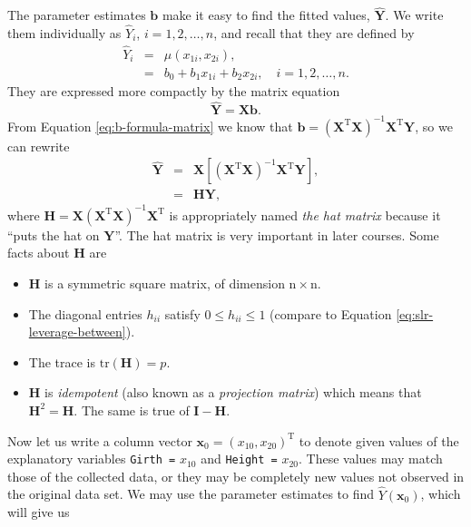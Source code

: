 \documentclass[captions=tableheading]{scrbook}
\begin{document}
The parameter estimates \(\mathbf{b}\) make it easy to find the fitted values, \(\hat{\mathbf{Y}}\). We write them individually as \(\hat{Y}_{i}\), \(i=1,2,\ldots,n\), and recall that they are defined by
\begin{eqnarray}
\hat{Y}_{i} & = & \hat{\mu}(x_{1i},x_{2i}),\\
 & = & b_{0}+b_{1}x_{1i}+b_{2}x_{2i},\quad i=1,2,\ldots,n.
\end{eqnarray}
They are expressed more compactly by the matrix equation
\begin{equation}
\hat{\mathbf{Y}}=\mathbf{X}\mathbf{b}.
\end{equation}
From Equation \ref{eq:b-formula-matrix} we know that \(\mathbf{b}=\left(\mathbf{X}^{\mathrm{T}}\mathbf{X}\right)^{-1}\mathbf{X}^{\mathrm{T}}\mathbf{Y}\), so we can rewrite
\begin{eqnarray}
\hat{\mathbf{Y}} & = & \mathbf{X}\left[\left(\mathbf{X}^{\mathrm{T}}\mathbf{X}\right)^{-1}\mathbf{X}^{\mathrm{T}}\mathbf{Y}\right],\\
 & = & \mathbf{H}\mathbf{Y},
\end{eqnarray}
where \(\mathbf{H}=\mathbf{X}\left(\mathbf{X}^{\mathrm{T}}\mathbf{X}\right)^{-1}\mathbf{X}^{\mathrm{T}}\) is appropriately named \emph{the hat matrix} because it ``puts the hat on \(\mathbf{Y}\)''. The hat matrix is very important in later courses. Some facts about \(\mathbf{H}\) are
\begin{itemize}
\item \(\mathbf{H}\) is a symmetric square matrix, of dimension \(\mathrm{n}\times\mathrm{n}\).
\item The diagonal entries \(h_{ii}\) satisfy \(0\leq h_{ii}\leq1\) (compare to Equation \ref{eq:slr-leverage-between}).
\item The trace is \(\mathrm{tr}(\mathbf{H})=p\).
\item \(\mathbf{H}\) is \emph{idempotent} (also known as a \emph{projection matrix}) which means that \(\mathbf{H}^{2}=\mathbf{H}\). The same is true of \(\mathbf{I}-\mathbf{H}\).
\end{itemize}

Now let us write a column vector \(\mathbf{x}_{0}=(x_{10},x_{20})^{\mathrm{T}}\) to denote given values of the explanatory variables \texttt{Girth =} \(x_{10}\) and \texttt{Height =} \(x_{20}\). These values may match those of the collected data, or they may be completely new values not observed in the original data set. We may use the parameter estimates to find \(\hat{Y}(\mathbf{x}_{0})\), which will give us
\end{document}
